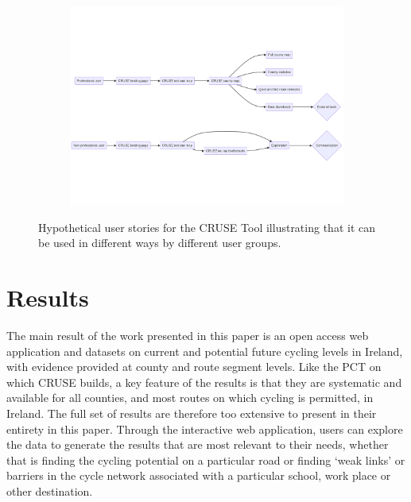 \documentclass[
  super,
  preprint,
  3p]{elsarticle}
\begin{document}
\begin{figure}

{\centering 

\begin{figure}[H]

{\centering \includegraphics{paper_files/figure-latex/mermaid-figure-1.png}

}

\end{figure}

}

\caption{\label{fig-user-stories}Hypothetical user stories for the CRUSE
Tool illustrating that it can be used in different ways by different
user groups.}

\end{figure}

\hypertarget{sec-results}{%
\section{Results}\label{sec-results}}

The main result of the work presented in this paper is an open access
web application and datasets on current and potential future cycling
levels in Ireland, with evidence provided at county and route segment
levels. Like the PCT on which CRUSE builds, a key feature of the results
is that they are systematic and available for all counties, and most
routes on which cycling is permitted, in Ireland. The full set of
results are therefore too extensive to present in their entirety in this
paper. Through the interactive web application, users can explore the
data to generate the results that are most relevant to their needs,
whether that is finding the cycling potential on a particular road or
finding `weak links' or barriers in the cycle network associated with a
particular school, work place or other destination.
\end{document}
